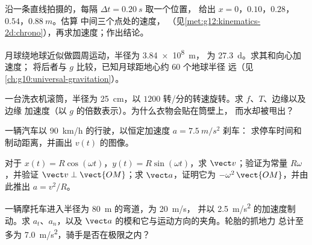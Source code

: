 \begin{exercise}[$\star\star$]\label{exo:g12:kinematics-2d:8}
沿一条直线拍摄的，每隔 $\Delta t = \qty{0.20}{s}$ 取一个位置，
给出 $x = 0$，$0.10$，$0.28$，$0.54$，$\qty{0.88}{m}$。估算
中间三个点处的速度，
（见\cref{met:g12:kinematics-2d:chrono}），再求加速度；作出结论。
\end{exercise}

\begin{exercise}[$\star\star$]\label{exo:g12:kinematics-2d:9}
月球绕地球近似做圆周运动，半径为 \qty{3.84e8}{m}，
为 \qty{27.3}{d}。求其和向心加速度；
将后者与 $g$ 比较，已知月球距地心约 $60$ 个地球半径
远（见\cref{ch:g10:universal-gravitation}）。
\end{exercise}

\begin{exercise}[$\star\star$]\label{exo:g12:kinematics-2d:10}
一台洗衣机滚筒，半径为 \qty{25}{cm}，以 $1200$
转/分的转速旋转。求 $f$、$T$、边缘以及边缘
加速度（以 $g$ 的倍数表示）。为什么衣物会贴在筒壁上，
而水却被甩出？
\end{exercise}

\begin{exercise}[$\star\star$]\label{exo:g12:kinematics-2d:11}
一辆汽车以 \qty{90}{km/h} 的行驶，以恒定加速度 $a = \qty{7.5}{m/s^2}$ 刹车：
求停车时间和制动距离，并画出 $v(t)$ 的图像。
\end{exercise}

\begin{exercise}[$\star\star\star$]\label{exo:g12:kinematics-2d:12}
对于 $x(t) = R\cos(\omega t)$，$y(t) = R\sin(\omega t)$，求
$\vect v$；验证为常量 $R\omega$，并验证
$\vect v \perp \vect{OM}$；求 $\vect a$，证明它为
$-\omega^2\,\vect{OM}$，并由此推出 $a = v^2/R$。
\end{exercise}

\begin{exercise}[$\star\star\star$]\label{exo:g12:kinematics-2d:13}
一辆摩托车进入半径为 \qty{80}{m} 的弯道，为 \qty{20}{m/s}，
并以 \qty{2.5}{m/s^2} 的加速度制动。求 $a_t$、$a_n$，以及
$\vect a$ 的模和它与运动方向的夹角。轮胎的抓地力
总计至多为 \qty{7.0}{m/s^2}，骑手是否在极限之内？
\end{exercise}

